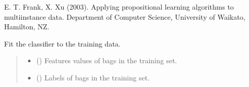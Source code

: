 \documentclass[letterpaper,10pt,english]{sphinxmanual}
\begin{document}
\begin{fulllineitems}
\sphinxAtStartPar
E. T. Frank, X. Xu (2003). Applying propositional learning algorithms to multi\sphinxhyphen{}instance data. Department of Computer
Science, University of Waikato, Hamilton, NZ.

\begin{fulllineitems}
\label{\detokenize{classifier/mi/_autosummary/miml.classifier.mi.mi_wrapper_classifier.MIWrapperClassifier:miml.classifier.mi.mi_wrapper_classifier.MIWrapperClassifier.fit}}
\pysigstartsignatures
\pysiglinewithargsret
{}
{\sphinxparamcomma {}\sphinxparamcomma {}}
{}
\pysigstopsignatures
\sphinxAtStartPar
Fit the classifier to the training data.
\begin{quote}\begin{description}
\begin{itemize}
\item {} 
\sphinxAtStartPar
{} (\sphinxstyleliteralemphasis{\sphinxupquote{ (}}\sphinxstyleliteralemphasis{\sphinxupquote{, }}\sphinxstyleliteralemphasis{\sphinxupquote{, }}\sphinxstyleliteralemphasis{\sphinxupquote{)}}) \textendash{} Features values of bags in the training set.

\item {} 
\sphinxAtStartPar
{} (\sphinxstyleliteralemphasis{\sphinxupquote{ (}}\sphinxstyleliteralemphasis{\sphinxupquote{, }}\sphinxstyleliteralemphasis{\sphinxupquote{, }}\sphinxstyleliteralemphasis{\sphinxupquote{)}}) \textendash{} Labels of bags in the training set.


\end{itemize}
\end{description}
\end{quote}
\end{fulllineitems}
\end{fulllineitems}
\end{document}
